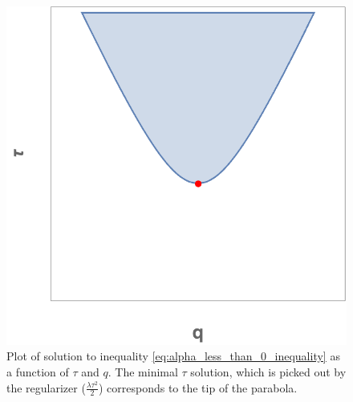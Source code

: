 \begin{figure}
\begin{center}
	\includegraphics[scale=.5]{figures/tau_q_solution_region.png}
\end{center}
\caption{Plot of solution to inequality \ref{eq:alpha_less_than_0_inequality} as a function of $\tau$ and $q$. The minimal $\tau$ solution, which is picked out by the regularizer ($\frac{\lambda \tau^2}{2} $) corresponds to the tip of the parabola.}
\label{fig:tau_q_solution}
\end{figure}








